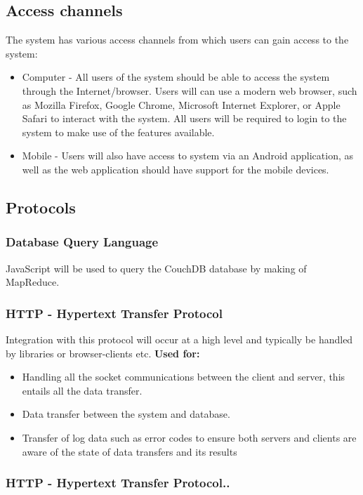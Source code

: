 \documentclass[a4paper]{article}
\begin{document}
  \subsection{Access channels}
  The system has various access channels from which users can gain access to the system:
  \begin{itemize}
  	\item Computer - All users of the system should be able to access the system through the Internet/browser. Users will can use a modern web browser, such as Mozilla Firefox, Google Chrome, Microsoft Internet Explorer, or Apple Safari to interact with the system. All users will be required to login to the system to make use of the features available.
  	\item Mobile - Users will also have access to system via an Android application, as well as the web application should have support for the mobile devices.
  \end{itemize} 	
  

\subsection{Protocols}
\subsubsection{Database Query Language}
JavaScript will be used to query the CouchDB database by making of MapReduce.

\subsubsection{HTTP - Hypertext Transfer Protocol}
Integration with this protocol will occur at a high level and typically be handled by libraries or browser-clients etc.
\textbf{Used for:	}
\begin{itemize}
	\item{Handling all the socket communications between the client and server, this entails all the data transfer.}
	\item{Data transfer between the system and database.}
	\item{Transfer of log data such as error codes to ensure both servers and clients are aware of the state of data transfers and its results}
\end{itemize}


\subsubsection{HTTP - Hypertext Transfer Protocol..}
\end{document}
